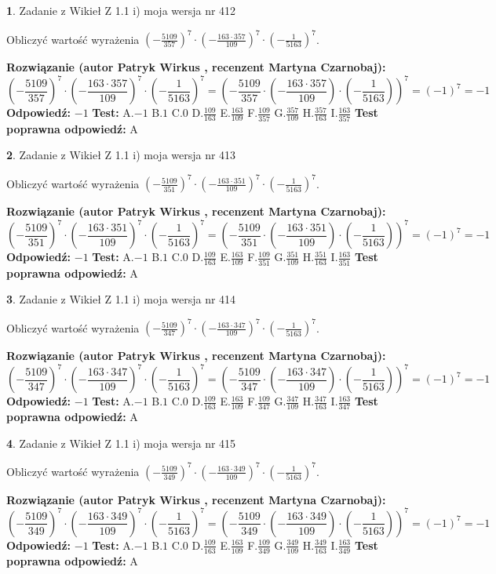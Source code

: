 \documentclass[12pt, a4paper]{article}
\theoremstyle{definition} %
\newtheorem{zad}{}
\newcommand{\zadStart}[1]{\begin{zad}#1\newline}
\newcommand{\zadStop}{\end{zad}}
\newcommand{\rozwStart}[2]{\noindent \textbf{Rozwiązanie (autor #1 , recenzent #2): }\newline}
\newcommand{\rozwStop}{\newline}
\newcommand{\odpStart}{\noindent \textbf{Odpowiedź:}\newline}
\newcommand{\odpStop}{\newline}
\newcommand{\testStart}{\noindent \textbf{Test:}\newline}
\newcommand{\testStop}{\newline}
\newcommand{\kluczStart}{\noindent \textbf{Test poprawna odpowiedź:}\newline}
\newcommand{\kluczStop}{\newline}
\begin{document}
\zadStart{Zadanie z Wikieł Z 1.1 i) moja wersja nr 412}

Obliczyć wartość wyrażenia $(-\frac{5109}{357})^{7} \cdot (-\frac{163 \cdot 357}{109})^{7} \cdot (-\frac{1}{5163})^{7}$.
\zadStop
\rozwStart{Patryk Wirkus}{Martyna Czarnobaj}
$$(-\frac{5109}{357})^{7} \cdot (-\frac{163 \cdot 357}{109})^{7} \cdot (-\frac{1}{5163})^{7} = (-\frac{5109}{357} \cdot (-\frac{163 \cdot 357}{109}) \cdot (-\frac{1}{5163}))^{7} = (-1)^{7} = -1$$
\rozwStop
\odpStart
$-1$
\odpStop
\testStart
A.$-1$ B.$1$ C.$0$ D.$\frac{109}{163}$ E.$\frac{163}{109}$
F.$\frac{109}{357}$ G.$\frac{357}{109}$
H.$\frac{357}{163}$
I.$\frac{163}{357}$
\testStop
\kluczStart
A
\kluczStop



\zadStart{Zadanie z Wikieł Z 1.1 i) moja wersja nr 413}

Obliczyć wartość wyrażenia $(-\frac{5109}{351})^{7} \cdot (-\frac{163 \cdot 351}{109})^{7} \cdot (-\frac{1}{5163})^{7}$.
\zadStop
\rozwStart{Patryk Wirkus}{Martyna Czarnobaj}
$$(-\frac{5109}{351})^{7} \cdot (-\frac{163 \cdot 351}{109})^{7} \cdot (-\frac{1}{5163})^{7} = (-\frac{5109}{351} \cdot (-\frac{163 \cdot 351}{109}) \cdot (-\frac{1}{5163}))^{7} = (-1)^{7} = -1$$
\rozwStop
\odpStart
$-1$
\odpStop
\testStart
A.$-1$ B.$1$ C.$0$ D.$\frac{109}{163}$ E.$\frac{163}{109}$
F.$\frac{109}{351}$ G.$\frac{351}{109}$
H.$\frac{351}{163}$
I.$\frac{163}{351}$
\testStop
\kluczStart
A
\kluczStop



\zadStart{Zadanie z Wikieł Z 1.1 i) moja wersja nr 414}

Obliczyć wartość wyrażenia $(-\frac{5109}{347})^{7} \cdot (-\frac{163 \cdot 347}{109})^{7} \cdot (-\frac{1}{5163})^{7}$.
\zadStop
\rozwStart{Patryk Wirkus}{Martyna Czarnobaj}
$$(-\frac{5109}{347})^{7} \cdot (-\frac{163 \cdot 347}{109})^{7} \cdot (-\frac{1}{5163})^{7} = (-\frac{5109}{347} \cdot (-\frac{163 \cdot 347}{109}) \cdot (-\frac{1}{5163}))^{7} = (-1)^{7} = -1$$
\rozwStop
\odpStart
$-1$
\odpStop
\testStart
A.$-1$ B.$1$ C.$0$ D.$\frac{109}{163}$ E.$\frac{163}{109}$
F.$\frac{109}{347}$ G.$\frac{347}{109}$
H.$\frac{347}{163}$
I.$\frac{163}{347}$
\testStop
\kluczStart
A
\kluczStop



\zadStart{Zadanie z Wikieł Z 1.1 i) moja wersja nr 415}

Obliczyć wartość wyrażenia $(-\frac{5109}{349})^{7} \cdot (-\frac{163 \cdot 349}{109})^{7} \cdot (-\frac{1}{5163})^{7}$.
\zadStop
\rozwStart{Patryk Wirkus}{Martyna Czarnobaj}
$$(-\frac{5109}{349})^{7} \cdot (-\frac{163 \cdot 349}{109})^{7} \cdot (-\frac{1}{5163})^{7} = (-\frac{5109}{349} \cdot (-\frac{163 \cdot 349}{109}) \cdot (-\frac{1}{5163}))^{7} = (-1)^{7} = -1$$
\rozwStop
\odpStart
$-1$
\odpStop
\testStart
A.$-1$ B.$1$ C.$0$ D.$\frac{109}{163}$ E.$\frac{163}{109}$
F.$\frac{109}{349}$ G.$\frac{349}{109}$
H.$\frac{349}{163}$
I.$\frac{163}{349}$
\testStop
\kluczStart
A
\kluczStop
\end{document}
